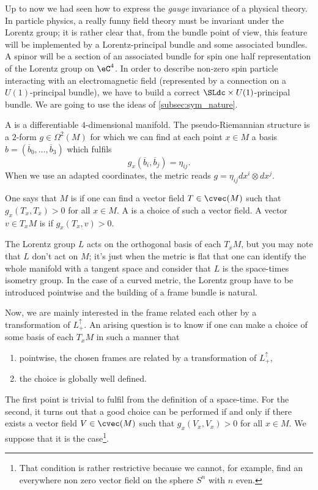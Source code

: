 Up to now we had seen how to express the \emph{gauge} invariance of a physical theory. In particle physics, a really funny field theory must be invariant under the Lorentz group; it is rather clear that, from the bundle point of view, this feature will be implemented by a Lorentz-principal bundle and some associated bundles. A spinor will be a section of an associated bundle for spin one half representation of the Lorentz group on $\eC^4$. In order to describe non-zero spin particle interacting with an electromagnetic field (represented by a connection on a $U(1)$-principal bundle), we have to build a correct $\SLdc\times U(1)$-principal bundle. We are going to use the ideas of \ref{subsec:sym_nature}.

A  is a differentiable  $4$-dimensional manifold. The pseudo-Riemannian structure is a $2$-form $g\in\Omega^2(M)$ for which we can find at each point $x\in M$ a basis $b=(\overline{ b }_0,\ldots,\overline{ b }_3)$ which fulfils
\[
  g_x(\overline{ b }_i,\overline{ b }_j)=\eta_{ij}.
\]
When we use an adapted coordinates, the metric reads $g=\eta_{ij}dx^i\otimes dx^j$.

One says that $M$ is  if one can find a vector field $T\in\cvec(M)$ such that $g_x(T_x,T_x)>0$ for all $x\in M$. A  is a choice of such a vector field. A vector $v\in T_xM$ is  if $g_x(T_x,v)>0$.

The Lorentz group $L$ acts on the orthogonal basis of each $T_xM$, but you may note that $L$ don't act on $M$; it's just when the metric is flat that one can identify the whole manifold with a tangent space and consider that $L$ is the space-times isometry group. In the case of a curved metric, the Lorentz group have to be introduced pointwise and the building of a frame bundle is natural.

Now, we are mainly interested in the frame related each other by a transformation of $L_+^{\uparrow}$. An arising question is to know if one can make a choice of some basis of each $T_xM$ in such a manner that 

\begin{enumerate}
\item pointwise, the chosen frames are related by a transformation of $L_+^{\uparrow}$,
\item the choice is globally well defined.
\end{enumerate}
The first point is trivial to fulfil from the definition of a space-time. For the second, it turns out that a good choice can be performed if and only if there exists a vector field $V\in\cvec(M)$ such that $g_x(V_x,V_x)>0$ for all $x\in M$. We suppose that it is the case\footnote{That condition is rather restrictive because we cannot, for example, find an everywhere non zero vector field on the sphere $S^n$ with $n$ even.}.

